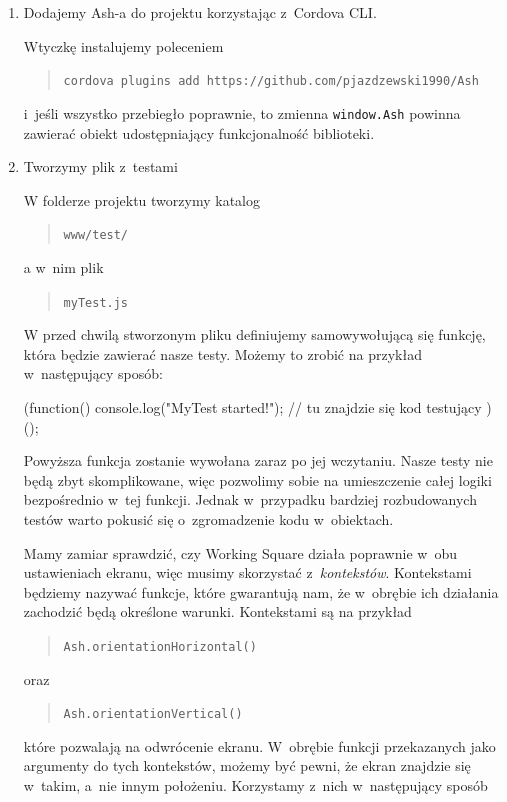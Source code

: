 \documentclass{xmgr}
\begin{document}
\begin{enumerate}
  \item Dodajemy Ash-a do projektu korzystając z~Cordova CLI.

Wtyczkę instalujemy poleceniem 
\begin{quote}
   \texttt{cordova plugins add https://github.com/pjazdzewski1990/Ash}
\end{quote}
i~jeśli wszystko przebiegło poprawnie, to zmienna \texttt{window.Ash} powinna zawierać obiekt udostępniający funkcjonalność biblioteki.  

 \item Tworzymy plik z~testami

W folderze projektu tworzymy katalog 
\begin{quote}
  \texttt{www/test/}
\end{quote} 
a w~nim plik 
\begin{quote}
  \texttt{myTest.js}
\end{quote} 
W przed chwilą stworzonym pliku definiujemy samowywołującą się funkcję, która będzie zawierać nasze testy. Możemy  to zrobić na przykład w~następujący sposób:

 \begin{javascriptcode}
  (function(){
	console.log("MyTest started!");
	//  tu znajdzie się kod testujący 
  })();
\end{javascriptcode}

Powyższa funkcja zostanie wywołana zaraz po jej wczytaniu. Nasze testy nie będą zbyt skomplikowane, więc pozwolimy sobie na umieszczenie całej logiki bezpośrednio w~tej funkcji. Jednak w~przypadku bardziej rozbudowanych testów warto pokusić się o~zgromadzenie kodu w~obiektach.

Mamy zamiar sprawdzić, czy Working Square działa poprawnie w~obu ustawieniach ekranu, więc musimy skorzystać z~\textit{kontekstów}. Kontekstami będziemy nazywać funkcje, które gwarantują nam, że w~obrębie ich działania zachodzić będą określone warunki. Kontekstami są na przykład

\begin{quote}
   \texttt{Ash.orientationHorizontal()}
\end{quote}

oraz 

\begin{quote}
   \texttt{Ash.orientationVertical()}
\end{quote}

które pozwalają na odwrócenie ekranu. W~obrębie funkcji przekazanych jako argumenty do tych kontekstów, możemy być pewni, że ekran znajdzie się w~takim, a~nie innym położeniu. Korzystamy z~nich w~następujący sposób


\end{enumerate}
\end{document}
